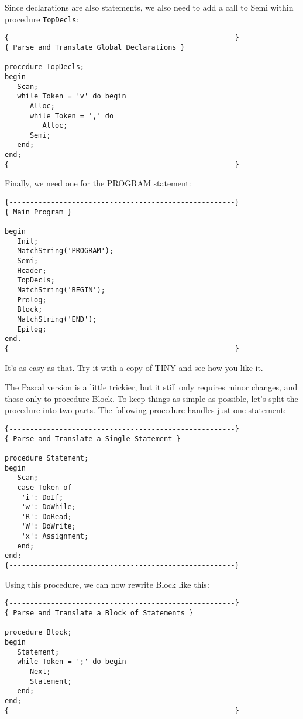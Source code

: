 Since declarations are also  statements, we  also  need to add a call to Semi within procedure {\tt TopDecls}:

\begin{verbatim}
{------------------------------------------------------}
{ Parse and Translate Global Declarations }

procedure TopDecls;
begin
   Scan;
   while Token = 'v' do begin
      Alloc;
      while Token = ',' do
         Alloc;
      Semi;
   end;
end;
{------------------------------------------------------}
\end{verbatim}

Finally, we need one for the PROGRAM statement:

\begin{verbatim}
{------------------------------------------------------}
{ Main Program }

begin
   Init;
   MatchString('PROGRAM');
   Semi;
   Header;
   TopDecls;
   MatchString('BEGIN');
   Prolog;
   Block;
   MatchString('END');
   Epilog;
end.
{------------------------------------------------------}
\end{verbatim}

It's as easy as that. Try it with a copy of TINY and see how you like it.

The Pascal version  is  a  little  trickier, but  it  still only requires  minor  changes, and those only to procedure Block. To keep things as simple as possible, let's split the procedure into two parts. The following procedure handles just one statement:

\begin{verbatim}
{------------------------------------------------------}
{ Parse and Translate a Single Statement }

procedure Statement;
begin
   Scan;
   case Token of
    'i': DoIf;
    'w': DoWhile;
    'R': DoRead;
    'W': DoWrite;
    'x': Assignment;
   end;
end;
{------------------------------------------------------}
\end{verbatim}

Using this procedure, we can now rewrite Block like this:

\begin{verbatim}
{------------------------------------------------------}
{ Parse and Translate a Block of Statements }

procedure Block;
begin
   Statement;
   while Token = ';' do begin
      Next;
      Statement;
   end;
end;
{------------------------------------------------------}
\end{verbatim}

